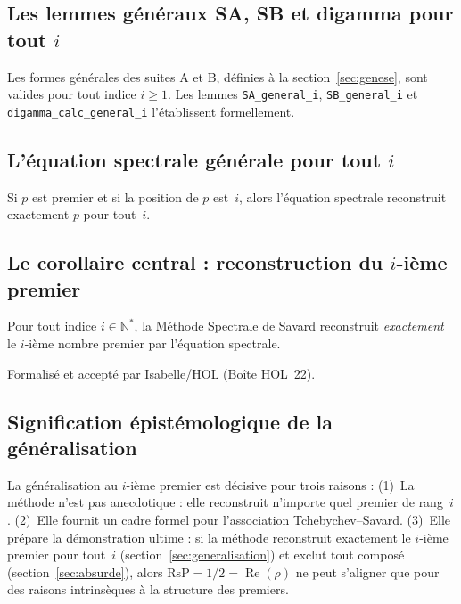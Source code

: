 \documentclass[]{pasj02}
\begin{document}
\subsection{Les lemmes généraux SA, SB et digamma pour tout $i$}
\label{ssec:lemmes_generaux}
\label{hol:lemmes_i_general}

Les formes générales des suites A et B, définies à la
section~\ref{sec:genese}, sont valides pour tout indice $i \geq 1$.  Les
lemmes \texttt{SA\_general\_i}, \texttt{SB\_general\_i} et
\texttt{digamma\_calc\_general\_i} l'établissent formellement.

\subsection{L'équation spectrale générale pour tout $i$}
\label{ssec:equation_generale}
\label{hol:equation_spectrale_i}

\begin{lemma}
  Si $p$ est premier et si la position de $p$ est~$i$, alors l'équation
  spectrale reconstruit exactement $p$ pour tout~$i$.
\end{lemma}

\subsection{Le corollaire central : reconstruction du $i$-ième premier}
\label{ssec:corollaire_central}
\label{hol:prime_equation_prime_i}

\begin{corollary}
  Pour tout indice $i \in \mathbb{N}^*$, la Méthode Spectrale de Savard
  reconstruit \emph{exactement} le $i$-ième nombre premier par l'équation
  spectrale.
\end{corollary}

\noindent Formalisé et accepté par Isabelle/HOL (Boîte HOL~22).

\subsection{Signification épistémologique de la généralisation}
\label{ssec:signification}

La généralisation au $i$-ième premier est décisive pour trois raisons :
(1)~La méthode n'est pas anecdotique : elle reconstruit n'importe quel
premier de rang~$i$.
(2)~Elle fournit un cadre formel pour l'association Tchebychev--Savard.
(3)~Elle prépare la démonstration ultime : si la méthode reconstruit
exactement le $i$-ième premier pour tout~$i$ (section~\ref{sec:generalisation})
et exclut tout composé (section~\ref{sec:absurde}), alors
$\mathrm{RsP} = 1/2 = \operatorname{Re}(\rho)$ ne peut s'aligner que pour
des raisons intrinsèques à la structure des premiers.
\end{document}

